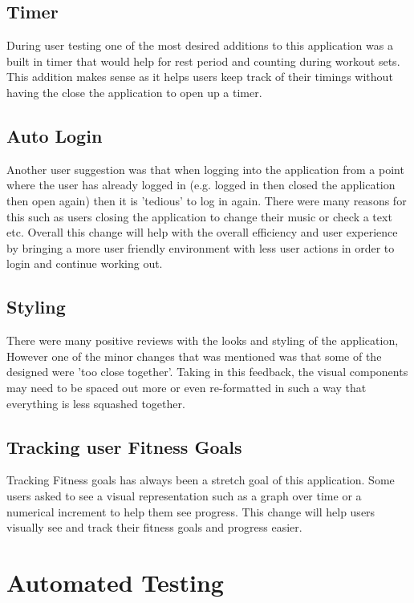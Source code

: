 \documentclass[12pt, titlepage]{article}
\begin{document}
\subsection{Timer}
During user testing one of the most desired additions to this application was a built in timer that would help for rest period and counting during workout sets. This addition makes sense as it helps users keep track of their timings without having the close the application to open up a timer. 
\subsection{Auto Login}
Another user suggestion was that when logging into the application from a point where the user has already logged in (e.g. logged in then closed the application then open again) then it is 'tedious' to log in again. There were many reasons for this such as users closing the application to change their music or check a text etc. Overall this change will help with the overall efficiency and user experience by bringing a more user friendly environment with less user actions in order to login and continue working out.
\subsection{Styling}
There were many positive reviews with the looks and styling of the application, However one of the minor changes that was mentioned was that some of the designed were 'too close together'. Taking in this feedback, the visual components may need to be spaced out more or even re-formatted in such a way that everything is less squashed together.
\subsection{Tracking user Fitness Goals}
Tracking Fitness goals  has always been a stretch goal of this application. Some users asked to see a visual representation such as a graph over time or a numerical increment to help them see progress. This change will help users visually see and track their fitness goals and progress easier.

\section{Automated Testing}
		
\end{document}

